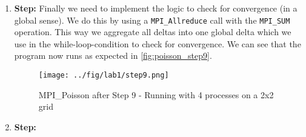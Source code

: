 \begin{enumerate}
    \item \textbf{Step:} Finally we need to implement the logic to check for convergence (in a global sense). We do this by using a \texttt{MPI\_Allreduce} call with the \texttt{MPI\_SUM} operation. This way we aggregate all deltas into one global delta which we use in the while-loop-condition to check for convergence. We can see that the program now runs as expected in \autoref{fig:poisson_step9}.
    \begin{figure}[H]
        \centering
        \texttt{[image: ../fig/lab1/step9.png]}
        \caption{MPI\_Poisson after Step 9 - Running with 4 processes on a 2x2 grid}
        \label{fig:poisson_step9}
    \end{figure}
    \item \textbf{Step:} 
\end{enumerate}
